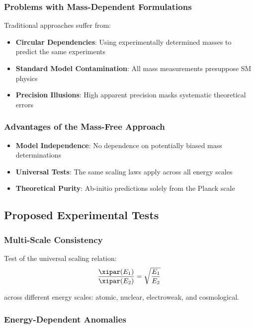 	\subsubsection{Problems with Mass-Dependent Formulations}
	
	Traditional approaches suffer from:
	\begin{itemize}
		\item \textbf{Circular Dependencies}: Using experimentally determined masses to predict the same experiments
		\item \textbf{Standard Model Contamination}: All mass measurements presuppose SM physics
		\item \textbf{Precision Illusions}: High apparent precision masks systematic theoretical errors
	\end{itemize}
	
	\subsubsection{Advantages of the Mass-Free Approach}
	
	\begin{itemize}
		\item \textbf{Model Independence}: No dependence on potentially biased mass determinations
		\item \textbf{Universal Tests}: The same scaling laws apply across all energy scales
		\item \textbf{Theoretical Purity}: Ab-initio predictions solely from the Planck scale
	\end{itemize}
	
	\subsection{Proposed Experimental Tests}
	\label{subsec:experimental_tests}
	
	\subsubsection{Multi-Scale Consistency}
	
	Test of the universal scaling relation:
	\begin{equation}
		\frac{\xipar(E_1)}{\xipar(E_2)} = \sqrt{\frac{E_1}{E_2}}
		\label{eq:scaling_test}
	\end{equation}
	
	across different energy scales: atomic, nuclear, electroweak, and cosmological.
	
	\subsubsection{Energy-Dependent Anomalies}
	
